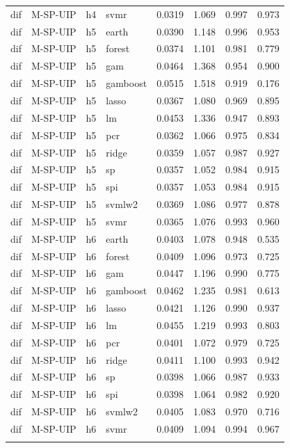 \begin{ThreePartTable}
\begin{longtable}[t]{llclcccc}
dif & M-SP-UIP & h4 & svmr & 0.0319 & 1.069 & 0.997 & 0.973\\
\addlinespace
dif & M-SP-UIP & h5 & earth & 0.0390 & 1.148 & 0.996 & 0.953\\
dif & M-SP-UIP & h5 & forest & 0.0374 & 1.101 & 0.981 & 0.779\\
dif & M-SP-UIP & h5 & gam & 0.0464 & 1.368 & 0.954 & 0.900\\
dif & M-SP-UIP & h5 & gamboost & 0.0515 & 1.518 & 0.919 & 0.176\\
dif & M-SP-UIP & h5 & lasso & 0.0367 & 1.080 & 0.969 & 0.895\\
dif & M-SP-UIP & h5 & lm & 0.0453 & 1.336 & 0.947 & 0.893\\
dif & M-SP-UIP & h5 & pcr & 0.0362 & 1.066 & 0.975 & 0.834\\
dif & M-SP-UIP & h5 & ridge & 0.0359 & 1.057 & 0.987 & 0.927\\
dif & M-SP-UIP & h5 & sp & 0.0357 & 1.052 & 0.984 & 0.915\\
dif & M-SP-UIP & h5 & spi & 0.0357 & 1.053 & 0.984 & 0.915\\
dif & M-SP-UIP & h5 & svmlw2 & 0.0369 & 1.086 & 0.977 & 0.878\\
dif & M-SP-UIP & h5 & svmr & 0.0365 & 1.076 & 0.993 & 0.960\\
\addlinespace
dif & M-SP-UIP & h6 & earth & 0.0403 & 1.078 & 0.948 & 0.535\\
dif & M-SP-UIP & h6 & forest & 0.0409 & 1.096 & 0.973 & 0.725\\
dif & M-SP-UIP & h6 & gam & 0.0447 & 1.196 & 0.990 & 0.775\\
dif & M-SP-UIP & h6 & gamboost & 0.0462 & 1.235 & 0.981 & 0.613\\
dif & M-SP-UIP & h6 & lasso & 0.0421 & 1.126 & 0.990 & 0.937\\
dif & M-SP-UIP & h6 & lm & 0.0455 & 1.219 & 0.993 & 0.803\\
dif & M-SP-UIP & h6 & pcr & 0.0401 & 1.072 & 0.979 & 0.725\\
dif & M-SP-UIP & h6 & ridge & 0.0411 & 1.100 & 0.993 & 0.942\\
dif & M-SP-UIP & h6 & sp & 0.0398 & 1.066 & 0.987 & 0.933\\
dif & M-SP-UIP & h6 & spi & 0.0398 & 1.064 & 0.982 & 0.920\\
dif & M-SP-UIP & h6 & svmlw2 & 0.0405 & 1.083 & 0.970 & 0.716\\
dif & M-SP-UIP & h6 & svmr & 0.0409 & 1.094 & 0.994 & 0.967\\
\addlinespace

\end{longtable}
\end{ThreePartTable}
